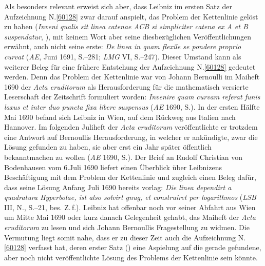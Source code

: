 \pend%
\pstart%
Als besonders relevant erweist sich aber, dass Leibniz im ersten Satz der Aufzeichnung N.\;\ref{60128} zwar darauf anspielt, das Problem der Kettenlinie gelöst zu haben (\textit{Inveni qualis sit linea catenae ACB si simpliciter catena ex A et B suspendatur}, ),
mit keinem Wort aber seine diesbezüglichen Veröffentlichungen erwähnt, auch nicht seine erste: \textit{De linea in quam flexile se pondere proprio curvat} (\textit{AE}, Juni 1691, S.--281; \textit{LMG} VI, S.--247).\cite{02033}\cite{01043}
Dieser Umstand kann als weiterer Beleg für eine frühere Entstehung der Aufzeichnung N.\;\ref{60128} gedeutet werden.
Denn das Problem der Kettenlinie war von Johann Bernoulli im Maiheft 1690 der \textit{Acta eruditorum} als Herausforderung für die mathematisch versierte Leserschaft der Zeitschrift formuliert worden:
\textit{Invenire quam curvam referat funis laxus et inter duo puncta fixa libere suspensus} %
(\textit{AE} 1690, S.)\cite{02620}\cite{01023}.
In der ersten Hälfte Mai 1690 befand sich Leibniz in Wien, auf dem Rückweg aus Italien nach Hannover.
Im folgenden Juliheft der \textit{Acta eruditorum} veröffentlichte er trotzdem eine Antwort auf Bernoullis Herausforderung, in welcher er ankündigte, zwar die Lösung gefunden zu haben, sie aber erst ein Jahr später öffentlich bekanntmachen zu wollen (\textit{AE} 1690, S.).\cite{02621}\cite{01023}
Der Brief an Rudolf Christian von Bodenhausen vom 6.\;Juli 1690 liefert einen Überblick über Leibnizens Beschäftigung mit dem Problem der Kettenlinie und zugleich einen Beleg dafür, dass seine Lösung Anfang Juli 1690 bereits vorlag: \textit{Die linea dependirt a quadratura Hyperbolae, ist also solvirt gnug, et construiret per logarithmos} (\textit{LSB} III, N., S.--21, bes. Z.\,f.).\cite{02622}
\pend%
\pstart%
Leibniz hat offenbar noch vor seiner Abfahrt aus Wien um Mitte Mai 1690 oder kurz danach Gelegenheit gehabt, das Maiheft der \textit{Acta eruditorum} zu lesen und sich Johann Bernoullis Fragestellung zu widmen.
Die Vermutung liegt somit nahe, dass er zu dieser Zeit auch die Aufzeichnung N.\;\ref{60128} verfasst hat, deren erster Satz () eine Aspielung auf die gerade gefundene, aber noch nicht veröffentlichte Lösung des Problems der Kettenlinie sein könnte.
